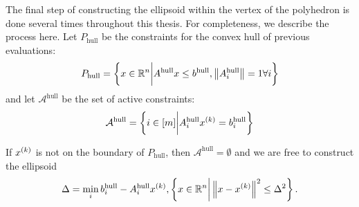 The final step of constructing the ellipsoid within the vertex of the polyhedron is done several times throughout this thesis.
For completeness, we describe the process here.
Let $P_{\textrm{hull}}$ be the constraints for the convex hull of previous evaluations:
\begin{align*}
P_{\textrm{hull}} = \left\{x \in \mathbb R^n \bigg | A^{\textrm{hull}} x \le b^{\textrm{hull}}, \left\|A_i^{\textrm{hull}}\right\| = 1 \forall i \right\}
\end{align*}
and let $\mathcal A^{\textrm{hull}}$ be the set of active constraints:
\begin{align*}
\mathcal A^{\textrm{hull}} = \left\{i \in [m] \bigg | A_i^{\textrm{hull}} x^{(k)} = b_i^{\textrm{hull}} \right\}
\end{align*}

If $x^{(k)}$ is not on the boundary of $P_{\textrm{hull}}$, then $\mathcal A^{\textrm{hull}} = \emptyset$ and we are free to construct the ellipsoid
\begin{align*}
\Delta = \min_{i} b_i^{\textrm{hull}} - A_i^{\textrm{hull}} x^{(k)},
\left\{x \in \mathbb R^n \bigg | \left\|x - x^{(k)}\right\|^2 \le \Delta^2\right\}.
\end{align*}
% 

